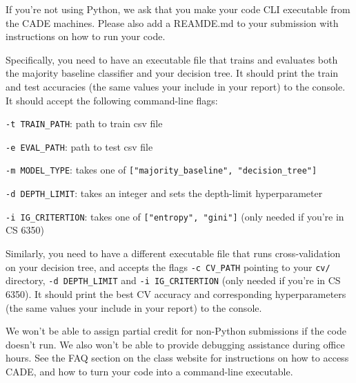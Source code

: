 \begin{non-python-note}
    If you're not using Python, we ask that you make your code CLI executable from the CADE machines. 
    Please also add a REAMDE.md to your submission with instructions on how to run your code.

    \vspace{1em}

    Specifically, you need to have an executable file that trains and evaluates both the majority baseline classifier and your decision tree.
    It should print the train and test accuracies (the same values your include in your report) to the console.
    It should accept the following command-line flags:
    \begin{compactitem}
        \item \texttt{-t TRAIN\_PATH}: path to train csv file
        \item \texttt{-e EVAL\_PATH}: path to test csv file
        \item \texttt{-m MODEL\_TYPE}: takes one of \texttt{["majority\_baseline", "decision\_tree"]}
        \item \texttt{-d DEPTH\_LIMIT}: takes an integer and sets the depth-limit hyperparameter
        \item \texttt{-i IG\_CRITERTION}: takes one of \texttt{["entropy", "gini"]} (only needed if you're in CS 6350)
    \end{compactitem}

    \vspace{1em}

    Similarly, you need to have a different executable file that runs cross-validation on your decision tree, and accepts the flags \texttt{-c CV\_PATH} pointing to your \texttt{cv/} directory, 
    \texttt{-d DEPTH\_LIMIT} and \texttt{-i IG\_CRITERTION} (only needed if you're in CS 6350).
    It should print the best CV accuracy and corresponding hyperparameters (the same values your include in your report) to the console.

    \vspace{1em}

    We won't be able to assign partial credit for non-Python submissions if the code doesn't run.
    We also won't be able to provide debugging assistance during office hours.
    See the FAQ section on the class website for instructions on how to access CADE, and how to turn your code into a command-line executable.
\end{non-python-note}
